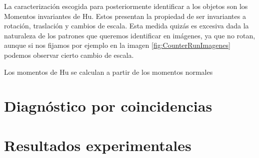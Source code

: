 La caracterización escogida para posteriormente identificar a los objetos son los
Momentos invariantes de Hu. Estos presentan la propiedad de ser invariantes a
rotación, traslación y cambios de escala. Esta medida quizás es excesiva dada la 
naturaleza de los patrones que queremos identificar en imágenes, ya que no rotan,
aunque si nos fijamos por ejemplo en la imagen \ref{fig:CounterRunImagenes}
podemos observar cierto cambio de escala.

Los momentos de Hu se calculan a partir de los momentos normales




\section{Diagnóstico por coincidencias}
\label{sec:CoincDist}


\section{Resultados experimentales}
\label{sec:CycleResults}





\endinput
